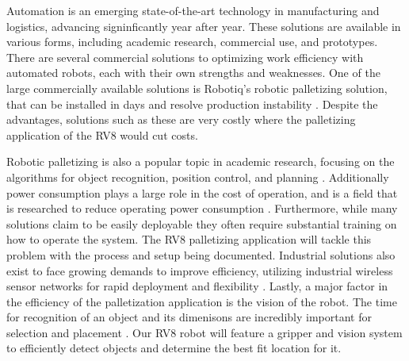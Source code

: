 
Automation is an emerging state-of-the-art technology in manufacturing and logistics, advancing signinficantly year after year. These solutions are available in various forms, including academic research, commercial use, and prototypes. There are several commercial solutions to optimizing work efficiency with automated robots, each with their own strengths and weaknesses. One of the large commercially available solutions is Robotiq's robotic palletizing solution, that can be installed in days and resolve production instability \cite{Robotiq2024}. Despite the advantages, solutions such as these are very costly where the palletizing application of the RV8 would cut costs.

Robotic palletizing is also a popular topic in academic research, focusing on the algorithms for object recognition, position control, and planning \cite{Xu2022}. Additionally power consumption plays a large role in the cost of operation, and is a field that is researched to reduce operating power consumption \cite{Deng2022}. Furthermore, while many solutions claim to be easily deployable they often require substantial training on how to operate the system. The RV8 palletizing application will tackle this problem with the process and setup being documented. Industrial solutions also exist to face growing demands to improve efficiency, utilizing industrial wireless sensor networks for rapid deployment and flexibility \cite{Gungor2009}. Lastly, a major factor in the efficiency of the palletization application is the vision of the robot. The time for recognition of an object and its dimenisons are incredibly important for selection and placement \cite{Abdullah2022}. Our RV8 robot will feature a gripper and vision system to efficiently detect objects and determine the best fit location for it.
